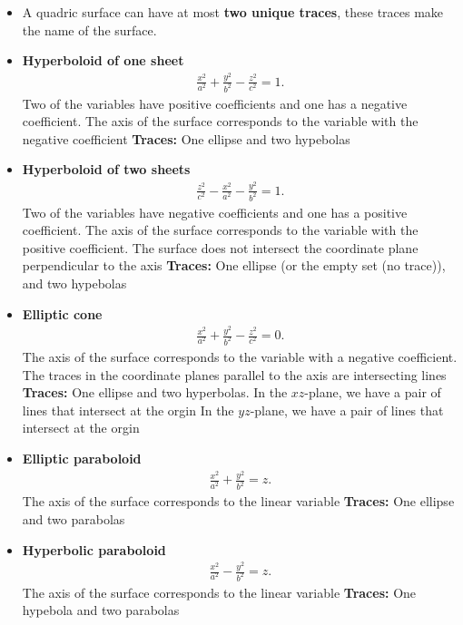 \documentclass{report}
\begin{document}
\begin{itemize}
    \item A quadric surface can have at most \textbf{two unique traces}, these traces make the name of the surface.
    \item \textbf{Hyperboloid of one sheet}
        \begin{align*}
            \frac{x^{2}}{a^{2}} + \frac{y^{2}}{b^{2}} - \frac{z^{2}}{c^{2}} = 1
        .\end{align*}
        Two of the variables have positive coefficients and one has a negative coefficient. The axis of the surface corresponds to the variable with the negative coefficient
        \bigbreak \noindent 
        \bigbreak \noindent 
        \textbf{Traces:} One ellipse and two hypebolas
    \item \textbf{Hyperboloid of two sheets}
        \begin{align*}
            \frac{z^{2}}{c^{2}} - \frac{x^{2}}{a^{2}} - \frac{y^{2}}{b^{2}} = 1
        .\end{align*}
        Two of the variables have negative coefficients and one has a positive coefficient. The axis of the surface corresponds to the variable with the positive coefficient. The surface does not intersect the coordinate plane perpendicular to the axis
        \bigbreak \noindent 
        \bigbreak \noindent 
        \textbf{Traces:} One ellipse (or the empty set (no trace)), and two hypebolas
    \item  \textbf{Elliptic cone}
        \begin{align*}
            \frac{x^{2}}{a^{2}} + \frac{y^{2}}{b^{2}} -\frac{z^{2}}{c^{2}} = 0
        .\end{align*}
        The axis of the surface corresponds to the variable with a negative coefficient. The traces in the coordinate planes parallel to the axis are intersecting lines
        \bigbreak \noindent 
        \bigbreak \noindent 
        \textbf{Traces:} One ellipse and two hyperbolas. 
        \smallbreak \noindent
        In the $xz$-plane, we have a pair of lines that intersect at the orgin
        \smallbreak \noindent
        In the $yz$-plane, we have a pair of lines that intersect at the orgin
    \item \textbf{Elliptic paraboloid}
        \begin{align*}
            \frac{x^{2}}{a^{2} } + \frac{y^{2}}{b^{2}} = z
        .\end{align*}
        The axis of the surface corresponds to the linear variable
        \bigbreak \noindent 
        \bigbreak \noindent 
        \textbf{Traces:} One ellipse and two parabolas
    \item \textbf{Hyperbolic paraboloid}
        \begin{align*}
            \frac{x^{2}}{a^{2} } - \frac{y^{2}}{b^{2}} = z
        .\end{align*}
        The axis of the surface corresponds to the linear variable
        \bigbreak \noindent 
        \bigbreak \noindent 
        \textbf{Traces:} One hypebola and two parabolas


\end{itemize}
\end{document}
